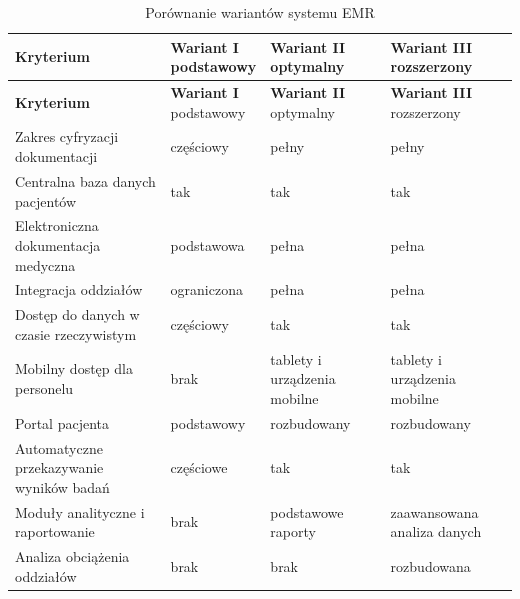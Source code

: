 \begin{longtable}{|p{4cm}|p{3cm}|p{3cm}|p{3cm}|}

\caption{Porównanie wariantów systemu EMR}
\label{tab:warianty_emr} \\

\hline
\textbf{Kryterium} &
\shortstack{\textbf{Wariant I} \\ podstawowy} &
\shortstack{\textbf{Wariant II} \\ optymalny} &
\shortstack{\textbf{Wariant III} \\ rozszerzony} \\
\hline
\endfirsthead

\hline
\textbf{Kryterium} &
\shortstack{\textbf{Wariant I} \\ podstawowy} &
\shortstack{\textbf{Wariant II} \\ optymalny} &
\shortstack{\textbf{Wariant III} \\ rozszerzony} \\
\hline
\endhead

Zakres cyfryzacji dokumentacji &
częściowy &
pełny &
pełny \\
\hline

Centralna baza danych pacjentów &
tak &
tak &
tak \\
\hline

Elektroniczna dokumentacja medyczna &
podstawowa &
pełna &
pełna \\
\hline

Integracja oddziałów &
ograniczona &
pełna &
pełna \\
\hline

Dostęp do danych w czasie rzeczywistym &
częściowy &
tak &
tak \\
\hline

Mobilny dostęp dla personelu &
brak &
tablety i urządzenia mobilne &
tablety i urządzenia mobilne \\
\hline

Portal pacjenta &
podstawowy &
rozbudowany &
rozbudowany \\
\hline

Automatyczne przekazywanie wyników badań &
częściowe &
tak &
tak \\
\hline

Moduły analityczne i raportowanie &
brak &
podstawowe raporty &
zaawansowana analiza danych \\
\hline

Analiza obciążenia oddziałów &
brak &
brak &
rozbudowana \\
\hline


\end{longtable}
